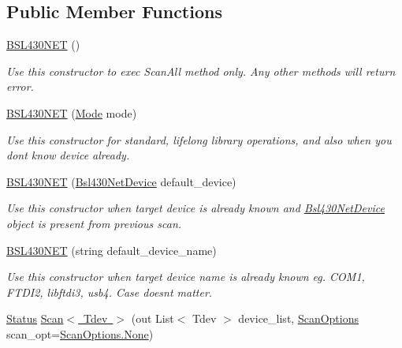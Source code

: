 \subsection*{Public Member Functions}
\begin{DoxyCompactItemize}
\item 
\mbox{\hyperlink{class_b_s_l430___n_e_t_1_1_b_s_l430_n_e_t_a03891e66951daf350f41fe53a176e4fd}{B\+S\+L430\+N\+ET}} ()
\begin{DoxyCompactList}\small\item\em Use this constructor to exec Scan\+All method only. Any other methods will return error. \end{DoxyCompactList}\item 
\mbox{\hyperlink{class_b_s_l430___n_e_t_1_1_b_s_l430_n_e_t_aed087f8cf602cd64e72c8b0d16ef2037}{B\+S\+L430\+N\+ET}} (\mbox{\hyperlink{namespace_b_s_l430___n_e_t_aa1c6981cb6f279b5491d861ca555a1d7}{Mode}} mode)
\begin{DoxyCompactList}\small\item\em Use this constructor for standard, lifelong library operations, and also when you dont know device already. \end{DoxyCompactList}\item 
\mbox{\hyperlink{class_b_s_l430___n_e_t_1_1_b_s_l430_n_e_t_a7b25d6f4f548b168e49d514d06947586}{B\+S\+L430\+N\+ET}} (\mbox{\hyperlink{class_b_s_l430___n_e_t_1_1_bsl430_net_device}{Bsl430\+Net\+Device}} default\+\_\+device)
\begin{DoxyCompactList}\small\item\em Use this constructor when target device is already known and \mbox{\hyperlink{class_b_s_l430___n_e_t_1_1_bsl430_net_device}{Bsl430\+Net\+Device}} object is present from previous scan. \end{DoxyCompactList}\item 
\mbox{\hyperlink{class_b_s_l430___n_e_t_1_1_b_s_l430_n_e_t_ac964a8649042a7015475454b307861ef}{B\+S\+L430\+N\+ET}} (string default\+\_\+device\+\_\+name)
\begin{DoxyCompactList}\small\item\em Use this constructor when target device name is already known eg. C\+O\+M1, F\+T\+D\+I2, libftdi3, usb4. Case doesnt matter. \end{DoxyCompactList}\item 
\mbox{\hyperlink{class_b_s_l430___n_e_t_1_1_status}{Status}} \mbox{\hyperlink{class_b_s_l430___n_e_t_1_1_b_s_l430_n_e_t_a0299d3468b1a5c2f4facf0bacfaa6bb0}{Scan$<$ Tdev $>$}} (out List$<$ Tdev $>$ device\+\_\+list, \mbox{\hyperlink{namespace_b_s_l430___n_e_t_a4cd6f8166a2a97ccb3405df2287d4ba8}{Scan\+Options}} scan\+\_\+opt=\mbox{\hyperlink{namespace_b_s_l430___n_e_t_a4cd6f8166a2a97ccb3405df2287d4ba8a6adf97f83acf6453d4a6a4b1070f3754}{Scan\+Options.\+None}})

\end{DoxyCompactItemize}
